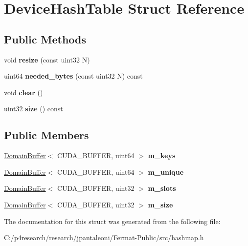 \hypertarget{struct_device_hash_table}{}\section{Device\+Hash\+Table Struct Reference}
\label{struct_device_hash_table}
\subsection*{Public Methods}
\begin{DoxyCompactItemize}
\item 
\mbox{\label{struct_device_hash_table_a64e1e8ef1f43503d68be0ccaabf25377}} 
void {\bfseries resize} (const uint32 N)
\item 
\mbox{\label{struct_device_hash_table_a8377cbc517291dc0327b2c196918d019}} 
uint64 {\bfseries needed\+\_\+bytes} (const uint32 N) const
\item 
\mbox{\label{struct_device_hash_table_a240c85d9be54d92f9cffa1dea7a5c640}} 
void {\bfseries clear} ()
\item 
\mbox{\label{struct_device_hash_table_aa7c10e04b4f20107b17afdf3627fcc1b}} 
uint32 {\bfseries size} () const
\end{DoxyCompactItemize}
\subsection*{Public Members}
\begin{DoxyCompactItemize}
\item 
\mbox{\label{struct_device_hash_table_a100b8da91cc237b7c8abc5fe9f334d12}} 
\hyperlink{class_domain_buffer}{Domain\+Buffer}$<$ C\+U\+D\+A\+\_\+\+B\+U\+F\+F\+ER, uint64 $>$ {\bfseries m\+\_\+keys}
\item 
\mbox{\label{struct_device_hash_table_a51aac5850dfab6f1dc34a2ae423f3872}} 
\hyperlink{class_domain_buffer}{Domain\+Buffer}$<$ C\+U\+D\+A\+\_\+\+B\+U\+F\+F\+ER, uint64 $>$ {\bfseries m\+\_\+unique}
\item 
\mbox{\label{struct_device_hash_table_ad086425e40dfce633afe11e047359b3c}} 
\hyperlink{class_domain_buffer}{Domain\+Buffer}$<$ C\+U\+D\+A\+\_\+\+B\+U\+F\+F\+ER, uint32 $>$ {\bfseries m\+\_\+slots}
\item 
\mbox{\label{struct_device_hash_table_a7ff74fd6db9c315d82210028ec57d008}} 
\hyperlink{class_domain_buffer}{Domain\+Buffer}$<$ C\+U\+D\+A\+\_\+\+B\+U\+F\+F\+ER, uint32 $>$ {\bfseries m\+\_\+size}
\end{DoxyCompactItemize}


The documentation for this struct was generated from the following file\+:\begin{DoxyCompactItemize}
\item 
C\+:/p4research/research/jpantaleoni/\+Fermat-\/\+Public/src/hashmap.\+h\end{DoxyCompactItemize}
